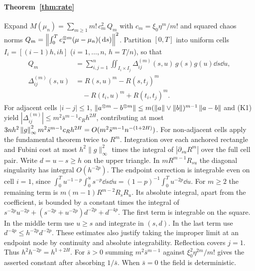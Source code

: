 \paragraph{Theorem~\ref{thm:rate}}
Expand $M(\mu_n)=\sum_{m\ge1}m!\,c_m^2\,Q_m$ with $c_m=\xi_0\eta^m/m!$ and squared chaos norms
$Q_m=\left\lVert \int_0^T e_s^{\otimes m}(\mu-\mu_n)(\,\mathrm{d} s)\right\rVert^2$.
Partition $[0,T]$ into uniform cells $I_i=[(i-1)h,ih]$ ($i=1,\dots,n$, $h=T/n$), so that
\begin{align*}
  Q_m&=\sum_{i,j=1}^n \iint_{I_i\times I_j}\Delta_{ij}^{(m)}(s,u)\,g(s)g(u)\dd s\dd u,\\
  \Delta_{ij}^{(m)}(s,u)&=R(s,u)^m-R(s,t_j)^m\\
  &\quad-R(t_i,u)^m+R(t_i,t_j)^m.
\end{align*}
For adjacent cells $|i-j|\le1$,
$\left\lVert a^{\otimes m}-b^{\otimes m}\right\rVert\le m(\left\lVert a\right\rVert\vee\left\lVert b\right\rVert)^{m-1}\left\lVert a-b\right\rVert$ and (K1) yield
$|\Delta_{ij}^{(m)}|\le m^2\bar s^{m-1}c_R h^{2H}$, contributing at most
$3n h^2\left\lVert g\right\rVert_\infty^2 m^2\bar s^{m-1}c_R h^{2H}=O(m^2\bar s^{m-1}n^{-(1+2H)})$. For
non-adjacent cells apply the fundamental theorem twice to $R^m$. Integration over each anchored
rectangle and Fubini cost at most $h^2\|g\|_\infty^2$ times the integral of
$|\partial_{su}R^m|$ over the full cell pair. Write $d=u-s\ge h$ on the upper triangle.
In $mR^{m-1}R_{su}$ the diagonal singularity has integral $O(h^{-2p})$.
The endpoint correction is integrable even on cell $i=1$, since
$\int_0^T u^{-1-p}\int_0^u s^{-p}\dd s\dd u=(1-p)^{-1}\int_0^T u^{-2p}\dd u$.
For $m\ge2$ the remaining term is $m(m-1)R^{m-2}R_sR_u$. Its absolute integral, apart from
the coefficient, is bounded by a constant times the integral of
$s^{-2p}u^{-2p}+(s^{-2p}+u^{-2p})d^{-2p}+d^{-4p}$.
The first term is integrable on the square. In the middle term use $u\ge s$ and integrate in
$(s,d)$. In the last term use $d^{-4p}\le h^{-2p}d^{-2p}$.
These estimates also justify taking the improper limit at an endpoint node by continuity and
absolute integrability. Reflection covers $j=1$. Thus $h^2 h^{-2p}=h^{1+2H}$.
For $\bar s>0$ summing $m^2\bar s^{m-1}$ against $\xi_0^2\eta^{2m}/m!$ gives the asserted
constant after absorbing $1/\bar s$. When $\bar s=0$ the field is deterministic.

